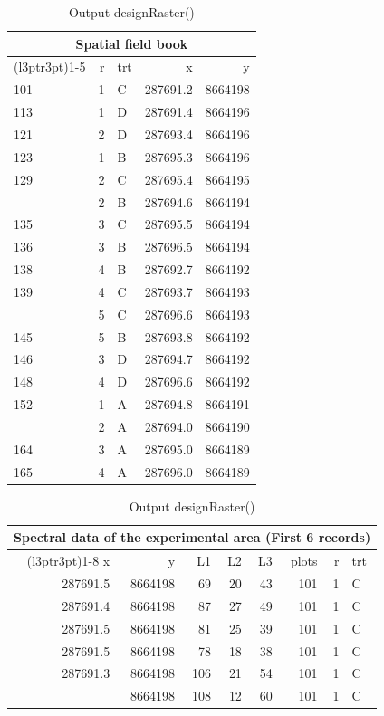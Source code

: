 \begin{table}
\caption{\label{tab:EU3}Output designRaster()}

\begin{tabular}{lrlrr}
\toprule
\multicolumn{5}{c}{Spatial field book} \\
\cmidrule(l{3pt}r{3pt}){1-5}
  & r & trt & x & y\\
\midrule
101 & 1 & C & 287691.2 & 8664198\\
113 & 1 & D & 287691.4 & 8664196\\
121 & 2 & D & 287693.4 & 8664196\\
123 & 1 & B & 287695.3 & 8664196\\
129 & 2 & C & 287695.4 & 8664195\\
\addlinespace
134 & 2 & B & 287694.6 & 8664194\\
135 & 3 & C & 287695.5 & 8664194\\
136 & 3 & B & 287696.5 & 8664194\\
138 & 4 & B & 287692.7 & 8664192\\
139 & 4 & C & 287693.7 & 8664193\\
\addlinespace
142 & 5 & C & 287696.6 & 8664193\\
145 & 5 & B & 287693.8 & 8664192\\
146 & 3 & D & 287694.7 & 8664192\\
148 & 4 & D & 287696.6 & 8664192\\
152 & 1 & A & 287694.8 & 8664191\\
\addlinespace
157 & 2 & A & 287694.0 & 8664190\\
164 & 3 & A & 287695.0 & 8664189\\
165 & 4 & A & 287696.0 & 8664189\\
\bottomrule
\end{tabular}
\begin{tabular}{rrrrrrrl}
\toprule
\multicolumn{8}{c}{Spectral data of the experimental area (First 6 records)} \\
\cmidrule(l{3pt}r{3pt}){1-8}
x & y & L1 & L2 & L3 & plots & r & trt\\
\midrule
287691.5 & 8664198 & 69 & 20 & 43 & 101 & 1 & C\\
287691.4 & 8664198 & 87 & 27 & 49 & 101 & 1 & C\\
287691.5 & 8664198 & 81 & 25 & 39 & 101 & 1 & C\\
287691.5 & 8664198 & 78 & 18 & 38 & 101 & 1 & C\\
287691.3 & 8664198 & 106 & 21 & 54 & 101 & 1 & C\\
\addlinespace
287691.3 & 8664198 & 108 & 12 & 60 & 101 & 1 & C\\
\bottomrule
\end{tabular}
\end{table}

